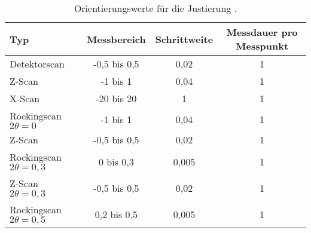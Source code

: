\begin{table}
    \centering
    \caption{Orientierungswerte für die Justierung \cite{V44}.}
    \label{tab:Justierung}
    \begin{tabular}[t]{l c c c}
    \toprule
    Typ & Messbereich & Schrittweite & Messdauer pro Messpunkt\\
    \midrule
    Detektorscan & -0,5 bis 0,5 & 0,02 & 1\\
    Z-Scan & -1 bis 1 & 0,04 & 1\\
    X-Scan & -20 bis 20 & 1 & 1\\
    Rockingscan $2\theta=0$ & -1 bis 1 & 0,04 & 1\\
    Z-Scan & -0,5 bis 0,5 & 0,02 & 1\\
    Rockingscan $2\theta=0,3$ & 0 bis 0,3 & 0,005 & 1\\
    Z-Scan $2\theta=0,3$ & -0,5 bis 0,5 & 0,02 & 1\\
    Rockingscan $2\theta=0,5$ & 0,2 bis 0,5 & 0,005 & 1\\
    \bottomrule
    \end{tabular}
    \end{table}